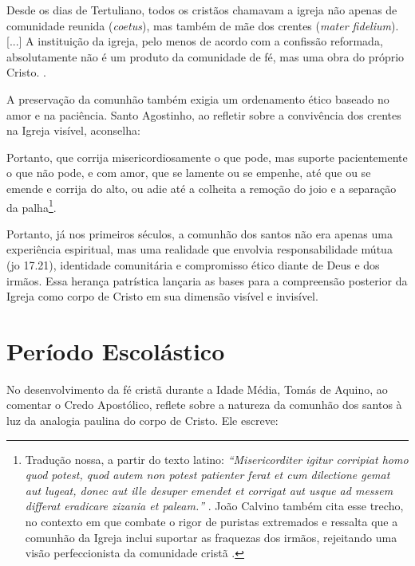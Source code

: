 \begin{citacao}
    Desde os dias de Tertuliano, todos os cristãos chamavam a igreja não apenas de comunidade reunida (\textit{coetus}), mas também de mãe dos crentes (\textit{mater fidelium}). [...] A instituição da igreja, pelo menos de acordo com a confissão reformada, absolutamente não é um produto da comunidade de fé, mas uma obra do próprio Cristo. \cite[p.~335]{bavinck2012}.
\end{citacao}

A preservação da comunhão também exigia um ordenamento ético baseado no amor e na paciência. Santo Agostinho, ao refletir sobre a convivência dos crentes na Igreja visível, aconselha:

\begin{citacao}
    Portanto, que corrija misericordiosamente o que pode, mas suporte pacientemente o que não pode, e com amor, que se lamente ou se empenhe, até que ou se emende e corrija do alto, ou adie até a colheita a remoção do joio e a separação da palha\footnote{Tradução nossa, a partir do texto latino: \textit{``\foreignlanguage{latin}{Misericorditer igitur corripiat homo quod potest, quod autem non potest patienter ferat et cum dilectione gemat aut lugeat, donec aut ille desuper emendet et corrigat aut usque ad messem differat eradicare zizania et paleam.}''} \cite[livro~III, capítulo~1, seção~15]{agostinhoContraParmeniani}. João Calvino também cita esse trecho, no contexto em que combate o rigor de puristas extremados e ressalta que a comunhão da Igreja inclui suportar as fraquezas dos irmãos, rejeitando uma visão perfeccionista da comunidade cristã \cite[v.~4, cap.~1, seção~16, p.~1887]{calvino2022}.}.
\end{citacao}

Portanto, já nos primeiros séculos, a comunhão dos santos não era apenas uma experiência espiritual, mas uma realidade que envolvia responsabilidade mútua (\gls{jo} 17.21), identidade comunitária e compromisso ético diante de Deus e dos irmãos. Essa herança patrística lançaria as bases para a compreensão posterior da Igreja como corpo de Cristo em sua dimensão visível e invisível.

\section{Período Escolástico}

No desenvolvimento da fé cristã durante a Idade Média, Tomás de Aquino, ao comentar o Credo Apostólico, reflete sobre a natureza da comunhão dos santos à luz da analogia paulina do corpo de Cristo. Ele escreve:

